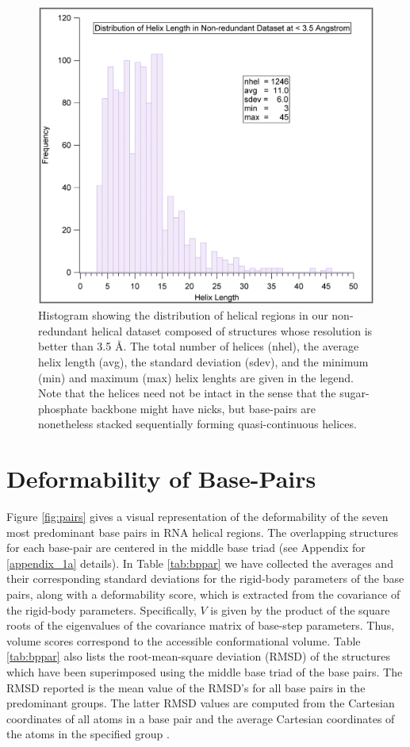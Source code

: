 \begin{figure}
\centering
\includegraphics[angle=0, scale=0.5]{Chapter3/heldistrib.png}
\caption{Histogram showing the distribution  of helical regions in our
non-redundant helical dataset  composed of structures whose resolution
is  better than  3.5 \AA.   The total  number of  helices  (nhel), the
average  helix length (avg),  the standard  deviation (sdev),  and the
minimum  (min)  and maximum  (max)  helix  lenghts  are given  in  the
legend. Note that the helices need not be intact in the sense that the
sugar-phosphate  backbone   might  have  nicks,   but  base-pairs  are
nonetheless stacked sequentially forming quasi-continuous helices.}
\label{fig:hellength}
\end{figure}


\section{Deformability of Base-Pairs} 
Figure   \ref{fig:pairs}  gives   a  visual   representation   of  the
deformability of the seven most  predominant base pairs in RNA helical
regions.  The  overlapping structures for each  base-pair are centered
in the middle base triad (see Appendix for \ref{appendix_1a} details).
In  Table \ref{tab:bppar}  we have  collected the  averages  and their
corresponding standard deviations for the rigid-body parameters of the
base pairs, along with a  deformability score, which is extracted from
the  covariance  of  the  rigid-body  parameters.   Specifically,  $V$
\cite{olson1998} is  given by the product  of the square  roots of the
eigenvalues of  the covariance matrix of  base-step parameters.  Thus,
volume  scores  correspond to  the  accessible conformational  volume.
Table \ref{tab:bppar} also lists the root-mean-square deviation (RMSD)
of the structures  which have been superimposed using  the middle base
triad of  the base pairs. The RMSD  reported is the mean  value of the
RMSD's for all base pairs  in the predominant groups.  The latter RMSD
values are computed  from the Cartesian coordinates of  all atoms in a
base pair  and the average Cartesian  coordinates of the  atoms in the
specified group \cite{eargle2006}.


